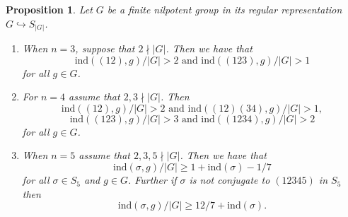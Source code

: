 \documentclass[11pt]{amsart}
\newtheorem{proposition}[theorem]{Proposition}
\newcommand{\ind}{\mathrm{ind}}
\numberwithin{equation}{section}
\begin{document}
\begin{proposition}\label{ind(sigma, g) propn}
    Let $G$ be a finite nilpotent group in its regular representation $G\hookrightarrow S_{|G|}$.
    \begin{enumerate}
        \item\label{c1 ind(sigma, g) propn} When $n=3$, suppose that $2 \nmid |G|$. Then we have that \begin{equation}\label{ind(sigma, g) propn f1}
        \ind((12),g)/|G| > 2 \text{ and } \ind((123),g)/|G| > 1
        \end{equation}
        for all $g \in G$.
        \item\label{c2 ind(sigma, g) propn} For $n=4$ assume that $2,3 \nmid |G|$. Then \begin{equation}\label{ind(sigma, g) propn f2}
        \ind((12),g)/|G| > 2\text{ and } \ind((12)(34),g)/|G| > 1, 
        \end{equation}
        \begin{equation}\label{ind(sigma, g) propn f3}
        \ind((123),g)/|G| > 3\text{ and } \ind((1234),g)/|G| > 2
        \end{equation}
        for all $g \in G$.
        \item\label{c3 ind(sigma, g) propn} When $n=5$ assume that $2,3,5 \nmid |G|$. Then we have that \begin{equation}\label{ind(sigma, g) propn f4}
        \ind(\sigma,g)/|G| \geq 1 + \ind(\sigma)-1/7\end{equation} for all $\sigma \in S_5$ and $g \in G$. Further if $\sigma$ is not conjugate to $(12345)$ in $S_5$ then \begin{equation}\label{ind(sigma, g) propn f5}\ind(\sigma,g)/|G| \geq 12/7 + \ind(\sigma).\end{equation}
    \end{enumerate}
\end{proposition}
\end{document}
